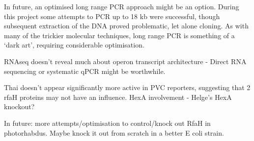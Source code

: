 In future, an optimised long range PCR approach might be an option. During this project some attempts to PCR up to 18 kb were successful, though subsequent extraction of the DNA proved problematic, let alone cloning. As with many of the trickier molecular techniques, long range PCR is something of a `dark art', requiring considerable optimisation.



RNAseq doesn't reveal much about operon transcript architecture - Direct RNA sequencing or systematic qPCR might be worthwhile.

Thai doesn't appear significantly more active in PVC reporters, suggesting that 2 rfaH proteins may not have an influence.
HexA involvement - Helge's HexA knockout?


In future: more attempts/optimisation to control/knock out RfaH in photorhabdus. Maybe knock it out from scratch in a better E coli strain.